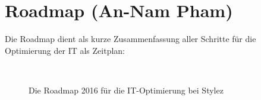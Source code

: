 \section{Roadmap (An-Nam Pham)}
Die Roadmap dient als kurze Zusammenfassung aller Schritte für die Optimierung der IT als Zeitplan:
\begin{figure}[H]
\centering
\begin{minipage}[t]{1\textwidth}
{\centering{}\\}
\caption{Die Roadmap 2016 für die IT-Optimierung bei Stylez} %
\label{img:Roadmap}
\end{minipage}
\end{figure}
